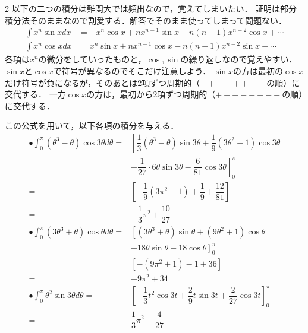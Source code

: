 \documentclass[../../main.tex]{subfiles}
\begin{document}
\begin{multicols}{2}
  以下の二つの積分は難関大では頻出なので，覚えてしまいたい．
  証明は部分積分法そのままなので割愛する．解答でそのまま使ってしまって問題ない．
  \begin{align}
    \int x^n\sin x dx & = - x^n \cos x + nx^{n-1} \sin x + n(n-1)x^{n-2}\cos x + \cdots \\
    \int x^n\cos x dx & =   x^n \sin x + nx^{n-1} \cos x - n(n-1)x^{n-2}\sin x - \cdots
  \end{align}
  各項は$x^n$の微分をしていったものと，$\cos, \sin$の繰り返しなので覚えやすい．
  $\sin x$と$\cos x$で符号が異なるのでそこだけ注意しよう．
  $\sin x$の方は最初の$\cos x$だけ符号が負になるが，そのあとは2項ずつ周期的（$++--++--$の順）に交代する．
  一方$\cos x$の方は，最初から2項ずつ周期的（$++--++--$の順）に交代する．

  この公式を用いて，以下各項の積分を与える．
  \begin{align}
    \bullet \int_0^\pi (\theta^3-\theta) \cos 3\theta d\theta
    = & \left[ \dfrac{1}{3}(\theta^3-\theta) \sin 3\theta + \dfrac{1}{9}(3\theta^2-1) \cos 3\theta \right. \\
    & \left. - \dfrac{1}{27} \cdot 6\theta \sin 3\theta- \dfrac{6}{81} \cos 3\theta \right]_0^\pi        \\
    = & \left[ -\dfrac{1}{9}(3\pi^2-1) + \dfrac{1}{9}+\dfrac{12}{81} \right]                                \\
    = & -\dfrac{1}{3}\pi^2 + \dfrac{10}{27}                                                                \\
    \bullet \int_0^\pi (3\theta^3+\theta) \cos\theta d\theta
    = & \left[ (3\theta^3+\theta) \sin\theta + (9\theta^2+1) \cos\theta \right.                          \\
    & \left. - 18\theta\sin\theta - 18\cos\theta \right]_0^\pi                                         \\
    = & [-(9\pi^2+1) - 1 + 36]                                                                           \\
    = & -9\pi^2 + 34                                                                                     \\
    \bullet \int_0^\pi \theta^2 \sin 3\theta d\theta
    = & \left[ -\dfrac{1}{3}t^2 \cos 3t + \dfrac{2}{9}t \sin 3t + \dfrac{2}{27} \cos 3t \right]_0^\pi       \\
    = & \dfrac{1}{3}\pi^2 - \dfrac{4}{27}                                                                  \\

\end{align}
\end{multicols}
\end{document}

